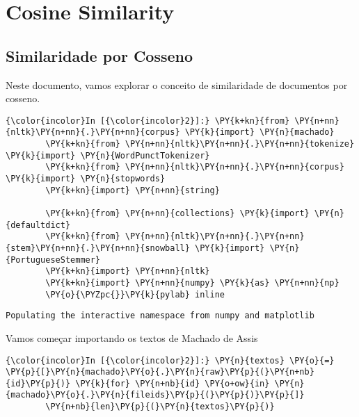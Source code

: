 \chapter{Cosine Similarity}

    
    

    
    \section{Similaridade por Cosseno}\label{similaridade-por-cosseno}

Neste documento, vamos explorar o conceito de similaridade de documentos
por cosseno.

    \begin{Verbatim}[commandchars=\\\{\}]
{\color{incolor}In [{\color{incolor}2}]:} \PY{k+kn}{from} \PY{n+nn}{nltk}\PY{n+nn}{.}\PY{n+nn}{corpus} \PY{k}{import} \PY{n}{machado}
        \PY{k+kn}{from} \PY{n+nn}{nltk}\PY{n+nn}{.}\PY{n+nn}{tokenize} \PY{k}{import} \PY{n}{WordPunctTokenizer}
        \PY{k+kn}{from} \PY{n+nn}{nltk}\PY{n+nn}{.}\PY{n+nn}{corpus} \PY{k}{import} \PY{n}{stopwords}
        \PY{k+kn}{import} \PY{n+nn}{string}
        
        \PY{k+kn}{from} \PY{n+nn}{collections} \PY{k}{import} \PY{n}{defaultdict}
        \PY{k+kn}{from} \PY{n+nn}{nltk}\PY{n+nn}{.}\PY{n+nn}{stem}\PY{n+nn}{.}\PY{n+nn}{snowball} \PY{k}{import} \PY{n}{PortugueseStemmer}
        \PY{k+kn}{import} \PY{n+nn}{nltk}
        \PY{k+kn}{import} \PY{n+nn}{numpy} \PY{k}{as} \PY{n+nn}{np}
        \PY{o}{\PYZpc{}}\PY{k}{pylab} inline
\end{Verbatim}

    \begin{Verbatim}[commandchars=\\\{\}]
Populating the interactive namespace from numpy and matplotlib

    \end{Verbatim}

    Vamos começar importando os textos de Machado de Assis

    \begin{Verbatim}[commandchars=\\\{\}]
{\color{incolor}In [{\color{incolor}2}]:} \PY{n}{textos} \PY{o}{=} \PY{p}{[}\PY{n}{machado}\PY{o}{.}\PY{n}{raw}\PY{p}{(}\PY{n+nb}{id}\PY{p}{)} \PY{k}{for} \PY{n+nb}{id} \PY{o+ow}{in} \PY{n}{machado}\PY{o}{.}\PY{n}{fileids}\PY{p}{(}\PY{p}{)}\PY{p}{]}
        \PY{n+nb}{len}\PY{p}{(}\PY{n}{textos}\PY{p}{)}
\end{Verbatim}

